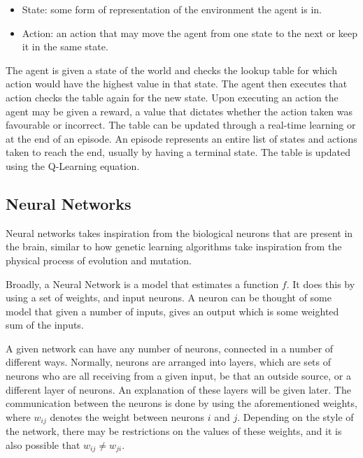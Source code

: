 \begin{itemize}
    \item State: some form of representation of the environment the agent is in.
    \item Action: an action that may move the agent from one state to the next or keep it in the same state.
\end{itemize}

The agent is given a state of the world and checks the lookup table for which
action would have the highest value in that state. The agent then executes that
action checks the table again for the new state. Upon executing an action the
agent may be given a reward, a value that dictates whether the action taken was
favourable or incorrect. The table can be updated through a real-time learning
or at the end of an episode. An episode represents an entire list of states and
actions taken to reach the end, usually by having a terminal state. The table is
updated using the Q-Learning equation.


\subsection{Neural Networks}

Neural networks takes inspiration from the biological neurons that
are present in the brain, similar to how genetic learning
algorithms take inspiration from the physical process of evolution
and mutation\cite{goldberg2006genetic}.

Broadly, a Neural Network is a model that estimates a function $f$.
It does this by using a set of weights, and input neurons. A neuron
can be thought of some model that given a number of inputs, gives
an output which is some weighted sum of the inputs.

A given network can have any number of neurons, connected in a number
of different ways. Normally, neurons are arranged into layers, which
are sets of neurons who are all receiving from a given input, be
that an outside source, or a different layer of neurons. An explanation of
these layers will be given later. The communication
between the neurons is done by using the aforementioned weights, where
$w_{ij}$ denotes the weight between neurons $i$ and $j$. Depending on the
style of the network, there may be restrictions on the values of these
weights, and it is also possible that $w_{ij} \ne w_{ji}$.

